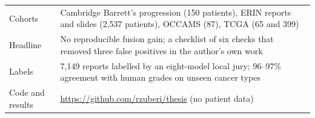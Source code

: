 \documentclass[11pt,a4paper]{article}
\begin{document}
\begin{center}\small
\begin{tabular}{@{}p{2.6cm}p{13.5cm}@{}}
\toprule
Cohorts & Cambridge Barrett's progression (150 patients), ERIN reports and slides (2,537 patients), OCCAMS (87), TCGA (65 and 399) \\
Headline & No reproducible fusion gain; a checklist of six checks that removed three false positives in the author's own work \\
Labels & 7,149 reports labelled by an eight-model local jury; 96--97\% agreement with human grades on unseen cancer types \\
Code and results & \url{https://github.com/rzuberi/thesis} (no patient data) \\
\bottomrule
\end{tabular}
\end{center}
\end{document}
